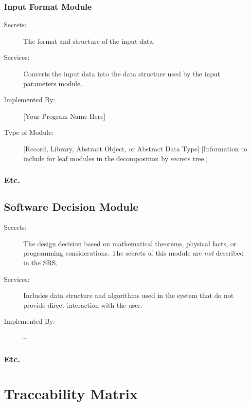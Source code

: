 \documentclass[12pt, titlepage]{article}
\newcommand{\mref}[1]{M\ref{#1}}
\begin{document}
\subsubsection{Input Format Module} %

\begin{description}
\item[Secrets:]The format and structure of the input data.
\item[Services:]Converts the input data into the data structure used by the
  input parameters module.
\item[Implemented By:] [Your Program Name Here]
\item[Type of Module:] [Record, Library, Abstract Object, or Abstract Data Type]
  [Information to include for leaf modules in the decomposition by secrets tree.]
\end{description}

\subsubsection{Etc.}


\subsection{Software Decision Module}

\begin{description}
\item[Secrets:] The design decision based on mathematical theorems, physical
  facts, or programming considerations. The secrets of this module are
  \emph{not} described in the SRS.
\item[Services:] Includes data structure and algorithms used in the system that
  do not provide direct interaction with the user. 
\item[Implemented By:] --
\end{description}

\subsubsection{Etc.}

\section{Traceability Matrix} \label{SecTM}
\end{document}
